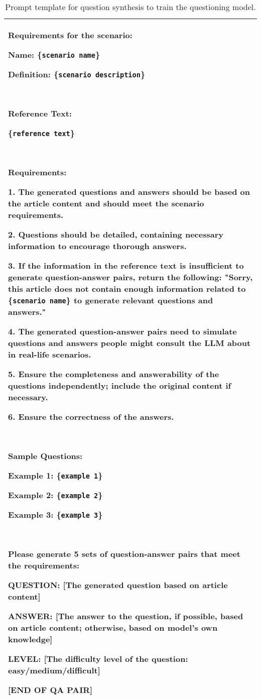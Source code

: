 \begin{table*}[tbh!]
  \caption{Prompt template for question synthesis to train the questioning model.} %
  \label{tab:prompt-qllm-train}
  \small
  \begin{tabularx}{\textwidth}{X}
    \toprule
        Requirements for the scenario:

        Name: \{\texttt{scenario name}\}
        
        Definition: \{\texttt{scenario description}\}
        
        \ 
        
        Reference Text:
        
        \{\texttt{reference text}\}

        \ 
        
        Requirements:
        
        1. The generated questions and answers should be based on the article content and should meet the scenario requirements.
        
        2. Questions should be detailed, containing necessary information to encourage thorough answers.
        
        3. If the information in the reference text is insufficient to generate question-answer pairs, return the following: "Sorry, this article does not contain enough information related to \{\texttt{scenario name}\} to generate relevant questions and answers."

        4. The generated question-answer pairs need to simulate questions and answers people might consult the LLM about in real-life scenarios.
        
        5. Ensure the completeness and answerability of the questions independently; include the original content if necessary.
        
        6. Ensure the correctness of the answers.
        
        \ 
        
        Sample Questions:
            
            Example 1: \{\texttt{example 1}\}
            
            Example 2: \{\texttt{example 2}\}
            
            Example 3: \{\texttt{example 3}\}

        \

        Please generate 5 sets of question-answer pairs that meet the requirements:
        
        QUESTION: [The generated question based on article content]
        
        ANSWER: [The answer to the question, if possible, based on article content; otherwise, based on model's own knowledge]
        
        LEVEL: [The difficulty level of the question: easy/medium/difficult]
        
        [END OF QA PAIR] \\
    \bottomrule
  \end{tabularx}
\end{table*}
